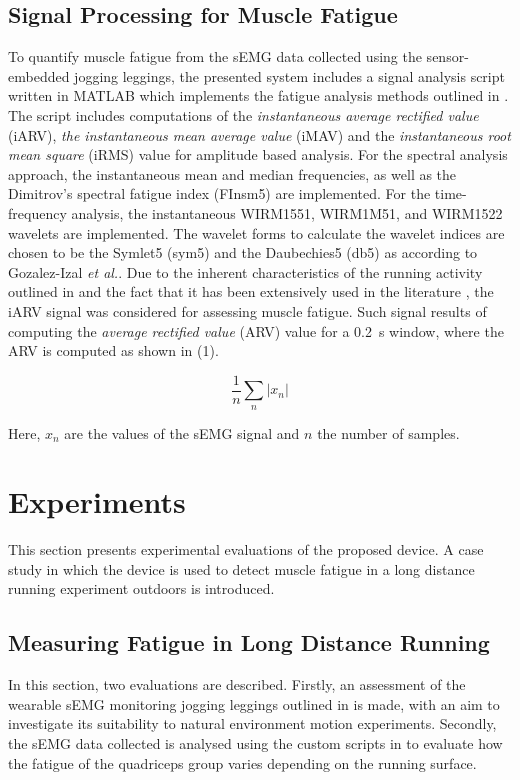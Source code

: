 \documentclass[letterpaper, 10 pt, conference]{ieeeconf}
\begin{document}
\subsection{Signal Processing for Muscle Fatigue}\label{ss:sig_proc}
To quantify muscle fatigue from the sEMG data collected using the
sensor-embedded jogging leggings, the presented system includes a signal
analysis script written in MATLAB which implements the fatigue analysis methods
outlined in . The script includes computations of the
\emph{instantaneous average rectified value} (iARV), \emph{the instantaneous mean average
value} (iMAV) and the \emph{instantaneous root mean square} (iRMS) value for
amplitude based analysis. For the spectral analysis approach, the instantaneous
mean and median frequencies, as well as the Dimitrov's spectral fatigue index
(FInsm5) \cite{dimitrov2006muscle} are implemented. For the time-frequency
analysis, the instantaneous WIRM1551, WIRM1M51, and WIRM1522 wavelets are
implemented. The wavelet forms to calculate the wavelet indices are chosen to
be the Symlet5 (sym5) and the Daubechies5 (db5) as according to Gozalez-Izal
\emph{et al.}\cite{gonzalez2010linear}. Due to the inherent characteristics of the running activity outlined in  and the fact that it has been extensively used in the literature \cite{gonzalez2012electromyographic}, the iARV signal was considered for assessing muscle fatigue. Such signal results of computing the \emph{average rectified value} (ARV) value for a \SI{0,2}{\second} window, where the ARV is computed as shown in (1).

\begin{equation}
\frac{1}{n} \sum_{n}^{} |x_n|
\end{equation}

Here, $x_n$ are the values of the sEMG signal and $n$ the number of samples.

\section{Experiments}\label{s:experiments}
This section presents experimental evaluations of the proposed device. A case study in which the device is used to detect muscle fatigue
in a long distance running experiment outdoors is introduced.







\subsection{Measuring Fatigue in Long Distance Running}\label{ss:fatigueexpt}
In this section, two evaluations are described. Firstly, an assessment of the
wearable sEMG monitoring jogging leggings outlined in   is
made, with an aim to investigate its suitability to natural environment motion
experiments. Secondly, the sEMG data collected is analysed using the custom
scripts in  to evaluate how the fatigue of the quadriceps
group varies depending on the running surface.
\end{document}
